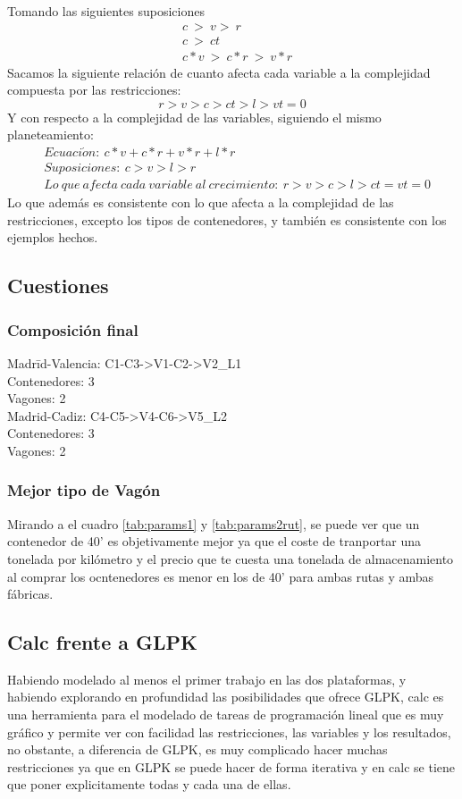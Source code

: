 \documentclass[11pt,spanish]{article}
\begin{document}
		Tomando las siguientes suposiciones
		\begin{align*}
			&c\ >\ v >\ r\\
			&c\ >\ ct\\
			&c*v\ >\ c*r\ >\ v*r
		\end{align*}
		Sacamos la siguiente relación de cuanto afecta cada variable a la complejidad compuesta por las restricciones:\\
		$$r>v>c>ct>l>vt = 0$$
		Y con respecto a la complejidad de las variables, siguiendo el mismo planeteamiento:
		\begin{align*}
			&Ecuaci\acute{o}n:\ c*v+c*r+v*r+l*r\\
			&Suposiciones:\ c > v > l > r\\
			&Lo\ que\ afecta\ cada\ variable\ al\ crecimiento:\ r > v > c > l > ct = vt = 0
		\end{align*}
		Lo que además es consistente con lo que afecta a la complejidad de las restricciones, excepto los tipos de contenedores, y también es consistente con los ejemplos hechos.
		\subsection{Cuestiones}
			\subsubsection{Composición final}
			\begin{tabbing}
			Madr\=id-Valencia: C1-C3->V1-C2->V2\_L1\\
			\>Contenedores: 3\\
			\>Vagones: 2\\
			Madrid-Cadiz: C4-C5->V4-C6->V5\_L2\\
			\>Contenedores: 3\\
			\>Vagones: 2
			\end{tabbing}
			\subsubsection{Mejor tipo de Vagón}
			Mirando a el cuadro \ref{tab:params1} y \ref{tab:params2rut}, se puede ver que un contenedor de 40' es objetivamente mejor ya que el coste de tranportar una tonelada por kilómetro y el precio que te cuesta una tonelada de almacenamiento al comprar los ocntenedores es menor en los de 40' para ambas rutas y ambas fábricas.
		\subsection{Calc frente a GLPK}
		Habiendo modelado al menos el primer trabajo en las dos plataformas, y habiendo explorando en profundidad las posibilidades que ofrece GLPK, calc es una herramienta para el modelado de tareas de programación lineal que es muy gráfico y permite ver con facilidad las restricciones, las variables y los resultados, no obstante, a diferencia de GLPK, es muy complicado hacer muchas restricciones ya que en GLPK se puede hacer de forma iterativa y en calc se tiene que poner explicitamente todas y cada una de ellas.
		
\end{document}
